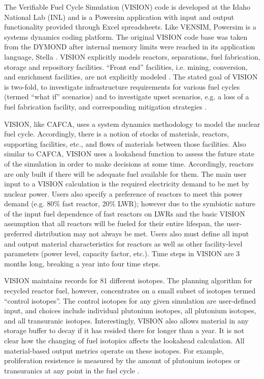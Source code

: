 The Verifiable Fuel Cycle Simulation (VISION) code is developed at the Idaho
National Lab (INL) and is a Powersim \cite{studio_powersim_2003} application
with input and output functionality provided through Excel spreadsheets. Like
VENSIM, Powersim is a systems dynamics coding platform. The original VISION code
base was taken from the DYMOND \cite{moisseytsev_dymond_2001} after internal
memory limits were reached in its application language, Stella
\cite{clauset_stella_1987}. VISION explicitly models reactors, separations, fuel
fabrication, storage and repository facilities. ``Front end'' facilities,
i.e. mining, conversion, and enrichment facilities, are not explicitly modeled
\cite{guerin_benchmark_2009}. The stated goal of VISION is two-fold, to
investigate infrastructure requirements for various fuel cycles (termed ``what
if'' scenarios) \cite{jacobson_verifiable_2010} and to investigate upset
scenarios, e.g. a loss of a fuel fabrication facility, and corresponding
mitigation strategies \cite{schweitzer_improved_2008}.

VISION, like CAFCA, uses a system dynamics methodology to model the nuclear fuel
cycle. Accordingly, there is a notion of stocks of materials, reactors,
supporting facilities, etc., and flows of materials between those
facilities. Also similar to CAFCA, VISION uses a lookahead function to assess
the future state of the simulation in order to make decisions at some
time. Accordingly, reactors are only built if there will be adequate fuel
available for them. The main user input to a VISION calculation is the required
electricity demand to be met by nuclear power. Users also specify a preference
of reactors to meet this power demand (e.g. 80\% fast reactor, 20\% LWR);
however due to the symbiotic nature of the input fuel dependence of fast
reactors on LWRs and the basic VISION assumption that all reactors will be
fueled for their entire lifespan, the user-preferred distribution may not always
be met. Users also must define all input and output material characteristics for
reactors as well as other facility-level parameters (power level, capacity
factor, etc.). Time steps in VISION are 3 months long, breaking a year into four
time steps.

VISION maintains records for 81 different isotopes. The planning algorithm for
recycled reactor fuel, however, concentrates on a small subset of isotopes
termed ``control isotopes''. The control isotopes for any given simulation are
user-defined input, and choices include individual plutonium isotopes, all
plutonium isotopes, and all transuranic isotopes. Interestingly, VISION also
allows material in any storage buffer to decay if it has resided there for
longer than a year. It is not clear how the changing of fuel isotopics affects
the lookahead calculation. All material-based output metrics operate on these
isotopes. For example, proliferation resistence is measured by the amount of
plutonium isotopes or transuranics at any point in the fuel cycle
\cite{yacout_vision_2006}.

